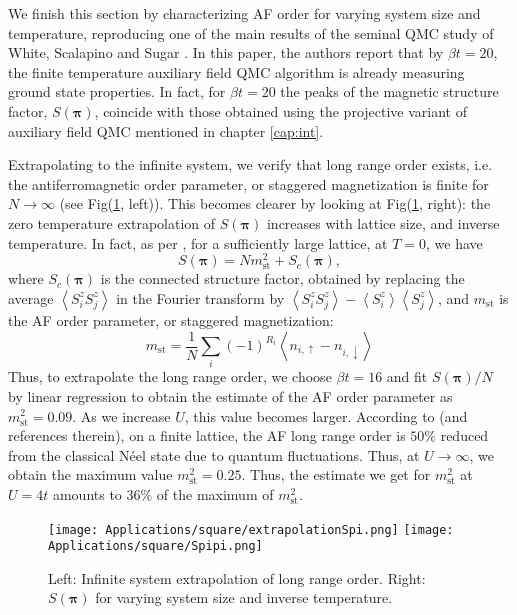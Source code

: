 We finish this section by characterizing \acs{AF} order for varying system size and temperature, reproducing one of the main results of the seminal \ac{QMC} study of White, Scalapino and Sugar \cite{white_numerical_1989}.
In this paper, the authors report that by $\beta t = 20 $, the finite temperature auxiliary field \ac{QMC} algorithm is already measuring ground state properties.
In fact, for $\beta t = 20 $ the peaks of the magnetic structure factor, $S ( \bm \pi )$, coincide with those obtained using the projective variant of auxiliary field \ac{QMC} mentioned in chapter \ref{cap:int}.

Extrapolating to the infinite system, we verify that long range order exists, i.e. the antiferromagnetic order parameter, or staggered magnetization is finite for $N \rightarrow \infty$ (see Fig(\ref{fig:spipi}, left)).
This becomes clearer by looking at Fig(\ref{fig:spipi}, right): the zero temperature extrapolation of $S (\bm \pi)$ increases with lattice size, and inverse temperature.
In fact, as per \cite{hirsch_two-dimensional_1985}, for a sufficiently large lattice, at $T= 0$, we have
\begin{equation}
S(\bm \pi) = N m_{\text{st}}^2 + S_c ( \bm \pi ) ,
\end{equation}
where $S_c ( \bm \pi )$ is the connected structure factor, obtained by replacing the average $\left\langle S^z_i S^z_j \right\rangle$ in the Fourier transform by $\left\langle S^z_i S^z_j \right\rangle - \left\langle S^z_i \right\rangle \left\langle S^z_j \right\rangle$, and $m_{\text{st}}$ is the \ac{AF} order parameter, or staggered magnetization:
\begin{equation}
m_{\text{st}} = \frac{1}{N} \sum_i (-1)^{R_i} \left\langle n_{i,\uparrow} - n_{i,\downarrow} \right\rangle
\end{equation}
Thus, to extrapolate the long range order, we choose $\beta t = 16$ and fit $S ( \bm \pi ) / N$ by linear regression to obtain the estimate of the \ac{AF} order parameter as $m_{\text{st}}^2 = 0.09$.
As we increase $U$, this value becomes larger.
According to \cite{hirsch_two-dimensional_1985} (and references therein), on a finite lattice, the \ac{AF} long range order is $50 \%$ reduced from the classical Néel state due to quantum fluctuations.
Thus, at $U \rightarrow \infty$, we obtain the maximum value $m_{\text{st}}^2 = 0.25$.
Thus, the estimate we get for $m_{\text{st}}^2$  at $U=4t$ amounts to $36\%$ of the maximum of $m_{\text{st}}^2$.
\vspace{-0.3cm}
\begin{figure}[H]
\texttt{[image: Applications/square/extrapolationSpi.png]}
\hspace{0.3cm}
\texttt{[image: Applications/square/Spipi.png]}
\caption[Left: Infinite system extrapolation of long range order.
Right: $S ( \bm \pi ) $ for varying system size and inverse temperature.]{Left: Infinite system extrapolation of long range order.
Right: $S ( \bm \pi ) $ for varying system size and inverse temperature.
 \label{fig:spipi} }
\end{figure}